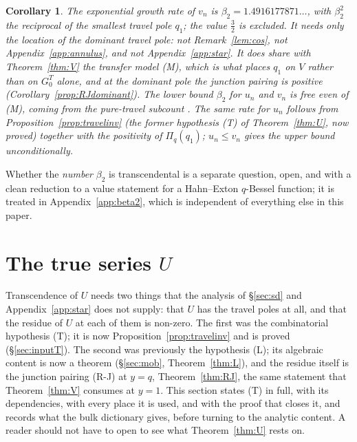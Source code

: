 \documentclass[11pt]{article}
\theoremstyle{plain}
\newtheorem{corollary}[theorem]{Corollary}
\theoremstyle{definition}
\theoremstyle{remark}
\begin{document}
\begin{corollary}\label{cor:beta}
The exponential growth rate of $v_n$ is $\beta_2=1.4916177871\ldots$, with
$\beta_2^2$ the reciprocal of the smallest travel pole $q_1$; the value $\tfrac32$ is excluded.
It needs only the location of the dominant travel pole: not Remark~\ref{lem:cos}, not
Appendix~\ref{app:annulus}, and not Appendix~\ref{app:star}. It does share with
Theorem~\ref{thm:V} the transfer model \textup{(M)}, which is what places $q_1$ on $V$ rather than
on $G^T_0$ alone, and at the dominant pole the junction pairing is positive
(Corollary~\ref{prop:RJdominant}). The
lower bound $\beta_2$ for $u_n$ and $v_n$ is free even of \textup{(M)}, coming from the
pure-travel subcount \cite{Bonfioli2026a}. The same rate for $u_n$
follows from Proposition~\ref{prop:travelinv} (the former hypothesis \textup{(T)} of
Theorem~\ref{thm:U}, now proved)
together with the positivity of $\Pi_q(q_1)$; $u_n\le v_n$ gives the upper bound
unconditionally.
\end{corollary}

Whether the \emph{number} $\beta_2$ is transcendental is a separate question, open, and with a
clean reduction to a value statement for a Hahn--Exton $q$-Bessel function; it is treated in
Appendix~\ref{app:beta2}, which is independent of everything else in this paper.

\section{The true series \texorpdfstring{$U$}{U}}\label{sec:U}

Transcendence of $U$ needs two things that the analysis of \S\ref{sec:sd} and
Appendix~\ref{app:star} does not supply: that $U$ has the travel poles at all, and that the residue
of $U$ at each of them is non-zero. The first was the combinatorial hypothesis \textup{(T)}; it is
now Proposition~\ref{prop:travelinv} and is proved (\S\ref{sec:inputT}). The second was previously
the hypothesis \textup{(L)}; its algebraic content is now a theorem (\S\ref{sec:mob},
Theorem~\ref{thm:L}), and the residue itself is the junction pairing \textup{(R-J)} at $y=q$,
Theorem~\ref{thm:RJ}, the same statement that Theorem~\ref{thm:V} consumes at $y=1$. This section
states \textup{(T)} in full, with its dependencies, with every place it is used, and with the proof
that closes it, and records what the bulk dictionary gives, before turning to the analytic content. A reader
should not have to open \cite{supplement} to see what Theorem~\ref{thm:U} rests on.
\end{document}
